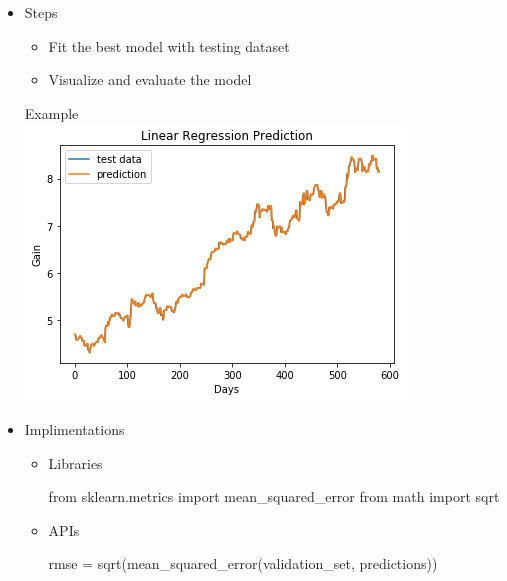 \documentclass[11pt]{article}
\makeatletter
\def\maxwidth{\ifdim\Gin@nat@width>\linewidth\linewidth
    \else\Gin@nat@width\fi}
\let\Oldincludegraphics\includegraphics
\renewcommand{\includegraphics}[1]{\Oldincludegraphics[width=.8\maxwidth]{#1}}
\providecommand{\tightlist}{%
      \setlength{\itemsep}{0pt}\setlength{\parskip}{0pt}}
\newenvironment{Shaded}{}{}
\newcommand{\NormalTok}[1]{{#1}}
\newcommand{\ImportTok}[1]{{#1}}
\newcommand{\OperatorTok}[1]{\textcolor[rgb]{0.40,0.40,0.40}{{#1}}}
\makeatother
\begin{document}
\begin{enumerate}
  \begin{itemize}
  \tightlist
  \item
    Steps

    \begin{itemize}
    \tightlist
    \item
      Fit the best model with testing dataset
    \item
      Visualize and evaluate the model
    \end{itemize}

    Example \\
    \includegraphics{./figures/17.jpg}
  \item
    Implimentations

    \begin{itemize}
    \item
      Libraries

\begin{Shaded}
\begin{Highlighting}[]
\ImportTok{from}\NormalTok{ sklearn.metrics }\ImportTok{import}\NormalTok{ mean_squared_error}
\ImportTok{from}\NormalTok{ math }\ImportTok{import}\NormalTok{ sqrt}
\end{Highlighting}
\end{Shaded}
    \item
      APIs

\begin{Shaded}
\begin{Highlighting}[]
\NormalTok{rmse }\OperatorTok{=}\NormalTok{ sqrt(mean_squared_error(validation_set, predictions))}
\end{Highlighting}
\end{Shaded}
    \end{itemize}
  \end{itemize}
\end{enumerate}
\end{document}

